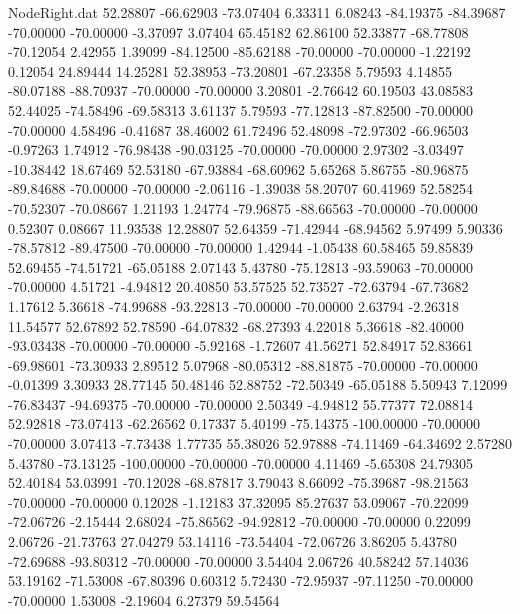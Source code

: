 \begin{filecontents}{NodeRight.dat}
  52.28807  -66.62903  -73.07404     6.33311    6.08243  -84.19375  -84.39687  -70.00000  -70.00000   -3.37097    3.07404   65.45182   62.86100
  52.33877  -68.77808  -70.12054     2.42955    1.39099  -84.12500  -85.62188  -70.00000  -70.00000   -1.22192    0.12054   24.89444   14.25281
  52.38953  -73.20801  -67.23358     5.79593    4.14855  -80.07188  -88.70937  -70.00000  -70.00000    3.20801   -2.76642   60.19503   43.08583
  52.44025  -74.58496  -69.58313     3.61137    5.79593  -77.12813  -87.82500  -70.00000  -70.00000    4.58496   -0.41687   38.46002   61.72496
  52.48098  -72.97302  -66.96503    -0.97263    1.74912  -76.98438  -90.03125  -70.00000  -70.00000    2.97302   -3.03497  -10.38442   18.67469
  52.53180  -67.93884  -68.60962     5.65268    5.86755  -80.96875  -89.84688  -70.00000  -70.00000   -2.06116   -1.39038   58.20707   60.41969
  52.58254  -70.52307  -70.08667     1.21193    1.24774  -79.96875  -88.66563  -70.00000  -70.00000    0.52307    0.08667   11.93538   12.28807
  52.64359  -71.42944  -68.94562     5.97499    5.90336  -78.57812  -89.47500  -70.00000  -70.00000    1.42944   -1.05438   60.58465   59.85839
  52.69455  -74.51721  -65.05188     2.07143    5.43780  -75.12813  -93.59063  -70.00000  -70.00000    4.51721   -4.94812   20.40850   53.57525
  52.73527  -72.63794  -67.73682     1.17612    5.36618  -74.99688  -93.22813  -70.00000  -70.00000    2.63794   -2.26318   11.54577   52.67892
  52.78590  -64.07832  -68.27393     4.22018    5.36618  -82.40000  -93.03438  -70.00000  -70.00000   -5.92168   -1.72607   41.56271   52.84917
  52.83661  -69.98601  -73.30933     2.89512    5.07968  -80.05312  -88.81875  -70.00000  -70.00000   -0.01399    3.30933   28.77145   50.48146
  52.88752  -72.50349  -65.05188     5.50943    7.12099  -76.83437  -94.69375  -70.00000  -70.00000    2.50349   -4.94812   55.77377   72.08814
  52.92818  -73.07413  -62.26562     0.17337    5.40199  -75.14375 -100.00000  -70.00000  -70.00000    3.07413   -7.73438    1.77735   55.38026
  52.97888  -74.11469  -64.34692     2.57280    5.43780  -73.13125 -100.00000  -70.00000  -70.00000    4.11469   -5.65308   24.79305   52.40184
  53.03991  -70.12028  -68.87817     3.79043    8.66092  -75.39687  -98.21563  -70.00000  -70.00000    0.12028   -1.12183   37.32095   85.27637
  53.09067  -70.22099  -72.06726    -2.15444    2.68024  -75.86562  -94.92812  -70.00000  -70.00000    0.22099    2.06726  -21.73763   27.04279
  53.14116  -73.54404  -72.06726     3.86205    5.43780  -72.69688  -93.80312  -70.00000  -70.00000    3.54404    2.06726   40.58242   57.14036
  53.19162  -71.53008  -67.80396     0.60312    5.72430  -72.95937  -97.11250  -70.00000  -70.00000    1.53008   -2.19604    6.27379   59.54564

\end{filecontents}
